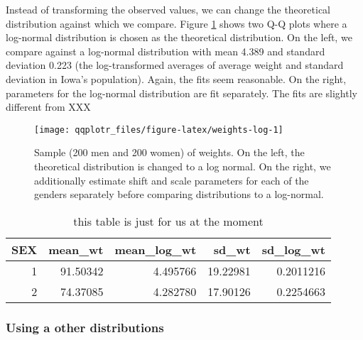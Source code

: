 Instead of transforming the observed values, we can change the
theoretical distribution against which we compare. Figure
\ref{fig:weights-log} shows two Q-Q plots where a log-normal
distribution is chosen as the theoretical distribution. On the left, we
compare against a log-normal distribution with mean 4.389 and standard
deviation 0.223 (the log-transformed averages of average weight and
standard deviation in Iowa's population). Again, the fits seem
reasonable. On the right, parameters for the log-normal distribution are
fit separately. The fits are slightly different from XXX

\begin{Schunk}
\begin{figure}

{\centering \texttt{[image: qqplotr\_files/figure-latex/weights-log-1]} 

}

\caption[Sample (200 men and 200 women) of weights]{Sample (200 men and 200 women) of weights. On the left, the theoretical distribution  is changed to a log normal. On the right, we additionally estimate shift and scale parameters for each of the genders separately before comparing distributions to a log-normal.}\label{fig:weights-log}
\end{figure}
\end{Schunk}

\begin{table}

\caption{\label{tab:table}this table is just for us at the moment}
\centering
\begin{tabular}[t]{r|r|r|r|r}
\hline
SEX & mean\_wt & mean\_log\_wt & sd\_wt & sd\_log\_wt\\
\hline
1 & 91.50342 & 4.495766 & 19.22981 & 0.2011216\\
\hline
2 & 74.37085 & 4.282780 & 17.90126 & 0.2254663\\
\hline
\end{tabular}
\end{table}

\subsubsection{Using a other
distributions}\label{using-a-other-distributions}

